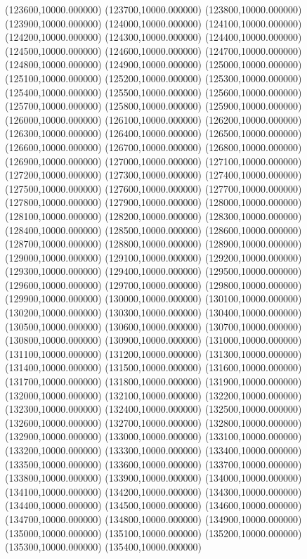 (123600,10000.000000)
(123700,10000.000000)
(123800,10000.000000)
(123900,10000.000000)
(124000,10000.000000)
(124100,10000.000000)
(124200,10000.000000)
(124300,10000.000000)
(124400,10000.000000)
(124500,10000.000000)
(124600,10000.000000)
(124700,10000.000000)
(124800,10000.000000)
(124900,10000.000000)
(125000,10000.000000)
(125100,10000.000000)
(125200,10000.000000)
(125300,10000.000000)
(125400,10000.000000)
(125500,10000.000000)
(125600,10000.000000)
(125700,10000.000000)
(125800,10000.000000)
(125900,10000.000000)
(126000,10000.000000)
(126100,10000.000000)
(126200,10000.000000)
(126300,10000.000000)
(126400,10000.000000)
(126500,10000.000000)
(126600,10000.000000)
(126700,10000.000000)
(126800,10000.000000)
(126900,10000.000000)
(127000,10000.000000)
(127100,10000.000000)
(127200,10000.000000)
(127300,10000.000000)
(127400,10000.000000)
(127500,10000.000000)
(127600,10000.000000)
(127700,10000.000000)
(127800,10000.000000)
(127900,10000.000000)
(128000,10000.000000)
(128100,10000.000000)
(128200,10000.000000)
(128300,10000.000000)
(128400,10000.000000)
(128500,10000.000000)
(128600,10000.000000)
(128700,10000.000000)
(128800,10000.000000)
(128900,10000.000000)
(129000,10000.000000)
(129100,10000.000000)
(129200,10000.000000)
(129300,10000.000000)
(129400,10000.000000)
(129500,10000.000000)
(129600,10000.000000)
(129700,10000.000000)
(129800,10000.000000)
(129900,10000.000000)
(130000,10000.000000)
(130100,10000.000000)
(130200,10000.000000)
(130300,10000.000000)
(130400,10000.000000)
(130500,10000.000000)
(130600,10000.000000)
(130700,10000.000000)
(130800,10000.000000)
(130900,10000.000000)
(131000,10000.000000)
(131100,10000.000000)
(131200,10000.000000)
(131300,10000.000000)
(131400,10000.000000)
(131500,10000.000000)
(131600,10000.000000)
(131700,10000.000000)
(131800,10000.000000)
(131900,10000.000000)
(132000,10000.000000)
(132100,10000.000000)
(132200,10000.000000)
(132300,10000.000000)
(132400,10000.000000)
(132500,10000.000000)
(132600,10000.000000)
(132700,10000.000000)
(132800,10000.000000)
(132900,10000.000000)
(133000,10000.000000)
(133100,10000.000000)
(133200,10000.000000)
(133300,10000.000000)
(133400,10000.000000)
(133500,10000.000000)
(133600,10000.000000)
(133700,10000.000000)
(133800,10000.000000)
(133900,10000.000000)
(134000,10000.000000)
(134100,10000.000000)
(134200,10000.000000)
(134300,10000.000000)
(134400,10000.000000)
(134500,10000.000000)
(134600,10000.000000)
(134700,10000.000000)
(134800,10000.000000)
(134900,10000.000000)
(135000,10000.000000)
(135100,10000.000000)
(135200,10000.000000)
(135300,10000.000000)
(135400,10000.000000)
